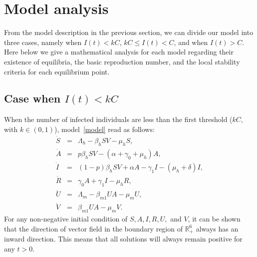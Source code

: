 \documentclass[preprint]{elsarticle}
\begin{document}
\section{Model analysis}\label{Sec3}
From the model description in the previous section, we can divide our model into three cases, namely when $I(t)< kC$, $kC\leq I(t)<C$, and when $I(t)>C$. Here below we give a mathematical analysis for each model regarding their existence of equilibria, the basic reproduction number, and the local stability criteria for each equilibrium point.

\subsection{Case when $I(t)< kC$}
When the number of infected individuals are less than the first threshold ($kC$, with $k \in (0,1)$), model~\eqref{model} read as follows:
\begin{eqnarray}\label{modela}
    \dot{S} &=& \Lambda_h - \beta_h S V - \mu_h S, \nonumber \\
    \dot{A} &=& p \beta_h S V - \left(\alpha + \gamma_0 + \mu_h\right)A, \nonumber \\
    \dot{I} &=& (1-p)\beta_h S V + \alpha A - \gamma_1 I - (\mu_h + \delta)I, \nonumber \\
    \dot{R} &=& \gamma_0 A + \gamma_1 I - \mu_h R, \\
    \dot{U} &=& \Lambda_m - \beta_{m1}UA - \mu_m U, \nonumber \\
    \dot{V} &=& \beta_{m1}UA - \mu_m V. \nonumber
\end{eqnarray}
For any non-negative initial condition of $S, A, I, R, U,$ and $V$, it can be shown that the direction of vector field in the boundary region of $\mathbb{R}_+^6$ always has an inward direction. This means that all solutions will always remain positive for any $t>0$.
\end{document}
